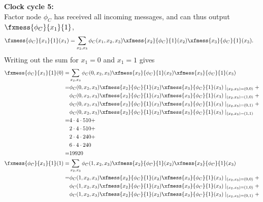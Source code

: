 \begin{exenumerate}
\begin{solution}
      { \bf Clock cycle 5:}\\
      Factor node $\phi_C$ has received all incoming messages, and can thus output $\fxmess{\phi_C}{x_1}{1}$,
      \begin{align}
        \fxmess{\phi_C}{x_1}{1}(x_1) & = \sum_{x_2,x_3} \phi_C(x_1,x_2,x_3) \xfmess{x_2}{\phi_C}{1}(x_2)\xfmess{x_3}{\phi_C}{1}(x_3).
      \end{align}      
      Writing out the sum for $x_1=0$ and $x_1=1$ gives
      \begin{align}
        \fxmess{\phi_C}{x_1}{1}(0) = &  \sum_{x_2,x_3} \phi_C(0,x_2,x_3) \xfmess{x_2}{\phi_C}{1}(x_2) \xfmess{x_3}{\phi_C}{1}(x_3)\\
                                   = &  \phi_C(0,x_2,x_3) \xfmess{x_2}{\phi_C}{1}(x_2) \xfmess{x_3}{\phi_C}{1}(x_3) \mid_{(x_2,x_3)=(0,0)} +\\
                                   & \phi_C(0,x_2,x_3) \xfmess{x_2}{\phi_C}{1}(x_2) \xfmess{x_3}{\phi_C}{1}(x_3) \mid_{(x_2,x_3)=(1,0)} +\\
                                   & \phi_C(0,x_2,x_3) \xfmess{x_2}{\phi_C}{1}(x_2) \xfmess{x_3}{\phi_C}{1}(x_3) \mid_{(x_2,x_3)=(0,1)} +\\
                                   & \phi_C(0,x_2,x_3) \xfmess{x_2}{\phi_C}{1}(x_2) \xfmess{x_3}{\phi_C}{1}(x_3) \mid_{(x_2,x_3)=(1,1)}\\
                                   = & 4 \cdot 4 \cdot 510 +\\
                                   &  2 \cdot 4 \cdot 510 +  \\
                                   &  2 \cdot 4 \cdot 240  + \\
                                   &  6 \cdot 4 \cdot 240 \\
                                   = & 19920\\
        \fxmess{\phi_C}{x_1}{1}(1) = &  \sum_{x_2,x_3} \phi_C(1,x_2,x_3) \xfmess{x_2}{\phi_C}{1}(x_2) \xfmess{x_3}{\phi_C}{1}(x_3)\\
                                   = &  \phi_C(1,x_2,x_3) \xfmess{x_2}{\phi_C}{1}(x_2) \xfmess{x_3}{\phi_C}{1}(x_3) \mid_{(x_2,x_3)=(0,0)} +\\
                                   & \phi_C(1,x_2,x_3) \xfmess{x_2}{\phi_C}{1}(x_2) \xfmess{x_3}{\phi_C}{1}(x_3) \mid_{(x_2,x_3)=(1,0)} +\\
                                   & \phi_C(1,x_2,x_3) \xfmess{x_2}{\phi_C}{1}(x_2) \xfmess{x_3}{\phi_C}{1}(x_3) \mid_{(x_2,x_3)=(0,1)} +\\

\end{align}
\end{solution}
\end{exenumerate}
